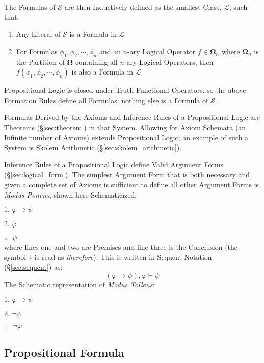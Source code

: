 The Formulas of $\mathcal{S}$ are then Inductively defined as the
smallest Class, $\mathcal{L}$, such that:
\begin{enumerate}
  \item Any Literal of $\mathcal{S}$ is a Formula in $\mathcal{L}$
  \item For Formulas $\phi_1, \phi_2, \cdots, \phi_n$ and an $n$-ary
    Logical Operator $f \in \mathbf{\Omega}_n$ where $\mathbf{\Omega}_n$
    is the Partition of $\mathbf{\Omega}$ containing all $n$-ary Logical
    Operators, then $f(\phi_1, \phi_2, \cdots, \phi_n)$ is also a
    Formula in $\mathcal{L}$
\end{enumerate}
Propositional Logic is closed under Truth-Functional Operators, so the
above Formation Rules define all Formulas: nothing else is a Formula
of $\mathcal{S}$.

Formulas Derived by the Axioms and Inference Rules of a Propositional
Logic are Theorems (\S\ref{sec:theorem}) in that System. Allowing for
Axiom Schemata (an Infinite number of Axioms) extends Propositional
Logic; an example of such a System is Skolem Arithmetic
(\S\ref{sec:skolem_arithmetic}).

Inference Rules of a Propositional Logic define Valid Argument Forms
(\S\ref{sec:logical_form}). The simplest Argument Form that is both
necessary and given a complete set of Axioms is sufficient to define
all other Argument Forms is \emph{Modus Ponens}, shown here
Schematicized:

$\textrm{1. }\varphi \rightarrow \psi$

$\textrm{2. }\varphi$

$\therefore\textrm{ }\psi$ \\
where lines one and two are Premises and line three is the Conclusion
(the symbol $\therefore$ is read as \emph{therefore}). This is written
in Sequent Notation (\S\ref{sec:sequent}) as:
\[
  (\varphi \rightarrow \psi), \varphi \vdash \psi
\]
The Schematic representation of \emph{Modus Tollens}:

$\textrm{1. }\varphi \rightarrow \psi$

$\textrm{2. }\neg\psi$

$\therefore\textrm{ }\neg\varphi$\\



\subsection{Propositional Formula}\label{sec:propositional_formula}

